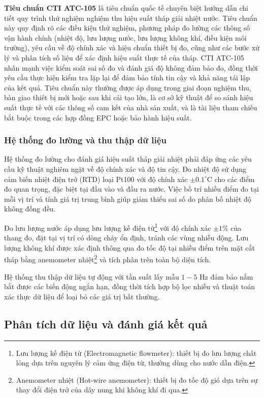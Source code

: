\documentclass[../main.tex]{subfiles}
\begin{document}
\textbf{Tiêu chuẩn CTI ATC-105} \cite{cti_cooling_towers_2011} là tiêu chuẩn quốc tế chuyên biệt hướng dẫn chi tiết quy trình thử nghiệm nghiệm thu hiệu suất tháp giải nhiệt nước. Tiêu chuẩn này quy định rõ các điều kiện thử nghiệm, phương pháp đo lường các thông số vận hành chính (nhiệt độ, lưu lượng nước, lưu lượng không khí, điều kiện môi trường), yêu cầu về độ chính xác và hiệu chuẩn thiết bị đo, cũng như các bước xử lý và phân tích số liệu để xác định hiệu suất thực tế của tháp. CTI ATC-105 nhấn mạnh việc kiểm soát sai số đo và đánh giá độ không đảm bảo đo, đồng thời yêu cầu thực hiện kiểm tra lặp lại để đảm bảo tính tin cậy và khả năng tái lập của kết quả. Tiêu chuẩn này thường được áp dụng trong giai đoạn nghiệm thu, bàn giao thiết bị mới hoặc sau khi cải tạo lớn, là cơ sở kỹ thuật để so sánh hiệu suất thực tế với các thông số cam kết của nhà sản xuất, và là tài liệu tham chiếu bắt buộc trong các hợp đồng EPC hoặc bảo hành hiệu suất.

\subsubsection{Hệ thống đo lường và thu thập dữ liệu}
Hệ thống đo lường cho đánh giá hiệu suất tháp giải nhiệt phải đáp ứng các yêu cầu kỹ thuật nghiêm ngặt về độ chính xác và độ tin cậy. Đo nhiệt độ sử dụng cảm biến nhiệt điện trở (RTD) loại Pt100 với độ chính xác $\pm 0.1^\circ\mathrm{C}$ cho các điểm đo quan trọng, đặc biệt tại đầu vào và đầu ra nước. Việc bố trí nhiều điểm đo tại mỗi vị trí và tính giá trị trung bình giúp giảm thiểu sai số do phân bố nhiệt độ không đồng đều.

Đo lưu lượng nước áp dụng lưu lượng kế điện từ\footnote{Lưu lượng kế điện từ (Electromagnetic flowmeter): thiết bị đo lưu lượng chất lỏng dựa trên nguyên lý cảm ứng điện từ, thường dùng cho nước dẫn điện.} với độ chính xác $\pm 1\%$ của thang đo, đặt tại vị trí có dòng chảy ổn định, tránh các vùng nhiễu động. Lưu lượng không khí được xác định thông qua đo tốc độ tại nhiều điểm trên mặt cắt tháp bằng anemometer nhiệt\footnote{Anemometer nhiệt (Hot-wire anemometer): thiết bị đo tốc độ gió dựa trên sự thay đổi điện trở của dây nung khi không khí đi qua.} và tích phân trên toàn bộ diện tích.

Hệ thống thu thập dữ liệu tự động với tần suất lấy mẫu $1{-}5$ Hz đảm bảo nắm bắt được các biến động ngắn hạn, đồng thời tích hợp bộ lọc nhiễu và thuật toán xác thực dữ liệu để loại bỏ các giá trị bất thường.

\subsection{Phân tích dữ liệu và đánh giá kết quả}
\label{sec:data_analysis_evaluation}
\end{document}
